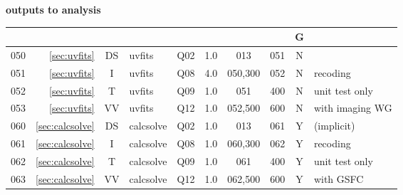 \small
\textbf{outputs to analysis}\hfill\break
\noindent
\begin{tabular}{r|r|c|l|c|c|c|c|c|l}
\hline
\usebox{\NM}&\usebox{\REF}&\usebox{\WW}&\usebox{\TPC}&\usebox{\ST}&\usebox{\EFF}&\usebox{\PRD}&\usebox{\SCC}&G&\usebox{\CMTS}\\
\hline
\hline
050&\ref{sec:uvfits}               &DS& uvfits               & Q02 & 1.0 & 013     & 051 & N &  \\
051&\ref{sec:uvfits}               &I & uvfits               & Q08 & 4.0 & 050,300 & 052 & N & recoding \\
052&\ref{sec:uvfits}               &T & uvfits               & Q09 & 1.0 & 051     & 400 & N & unit test only \\
053&\ref{sec:uvfits}               &VV& uvfits               & Q12 & 1.0 & 052,500 & 600 & N & with imaging WG \\
060&\ref{sec:calcsolve}            &DS& calcsolve            & Q02 & 1.0 & 013     & 061 & Y & (implicit) \\
061&\ref{sec:calcsolve}            &I & calcsolve            & Q08 & 1.0 & 060,300 & 062 & Y & recoding \\
062&\ref{sec:calcsolve}            &T & calcsolve            & Q09 & 1.0 & 061     & 400 & Y & unit test only \\
063&\ref{sec:calcsolve}            &VV& calcsolve            & Q12 & 1.0 & 062,500 & 600 & Y & with GSFC \\
\hline
\end{tabular}\vspace{6mm}

